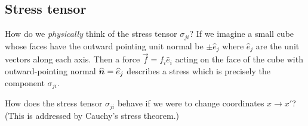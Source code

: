 
\lecture{}

\subsection{Stress tensor}

\begin{node}
How do we \emph{physically} think of the stress tensor $\sigma_{ji}$?
If we imagine a small cube whose faces have the outward pointing unit
normal be $\pm\widehat{e}_{j}$ where $\widehat{e}_{j}$ are the unit
vectors along each axis. Then a force $\vec{f}=f_{i}\widehat{e}_{i}$
acting on the face of the cube with outward-pointing normal
$\widehat{\boldsymbol{n}}=\widehat{e}_{j}$ describes a stress which is
precisely the component $\sigma_{ji}$.
\end{node}

\begin{puzzle}
How does the stress tensor $\sigma_{ji}$ behave if we were to change
coordinates $x\to x'$? (This is addressed by Cauchy's stress theorem.)
\end{puzzle}

